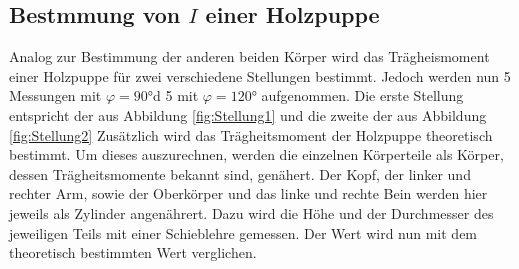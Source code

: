     \subsection{Bestmmung von $I$ einer Holzpuppe}
    Analog zur Bestimmung der anderen beiden Körper wird das Trägheismoment einer Holzpuppe für zwei verschiedene Stellungen bestimmt.
    Jedoch werden nun 5 Messungen mit $\varphi= 90$\unit{\degree}d 5  mit $\varphi= 120$\unit{\degree} aufgenommen.
    Die erste Stellung entspricht der aus Abbildung \ref{fig:Stellung1} und die zweite der aus Abbildung \ref{fig:Stellung2} %
    Zusätzlich wird das Trägheitsmoment der Holzpuppe theoretisch bestimmt.
    Um dieses auszurechnen, werden die einzelnen Körperteile als Körper, dessen Trägheitsmomente bekannt sind, genähert.
    Der Kopf, der linker und rechter Arm, sowie der Oberkörper und das linke und rechte Bein werden hier jeweils als Zylinder angenährert.
    Dazu wird die Höhe und der Durchmesser des jeweiligen Teils mit einer Schieblehre gemessen.
    Der Wert wird nun mit dem theoretisch bestimmten Wert verglichen.



